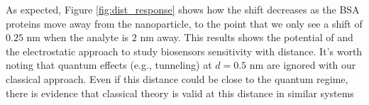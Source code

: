 As expected, Figure \ref{fig:dist_response} shows how the shift decreases as the BSA 
proteins move away from the nanoparticle, to the point that we only see a shift of 
$0.25$ nm when the analyte is $2$ nm away. This results shows the potential of \pygbe 
and the electrostatic approach to study biosensors sensitivity with distance. It's 
worth noting that quantum effects (e.g., tunneling) at $d=0.5$ nm are ignored with 
our classical approach. Even if this distance could be close to the quantum regime, 
there is evidence that classical theory is valid at this distance in similar systems
\cite{SavageETal2012, EstebanETal2012}
